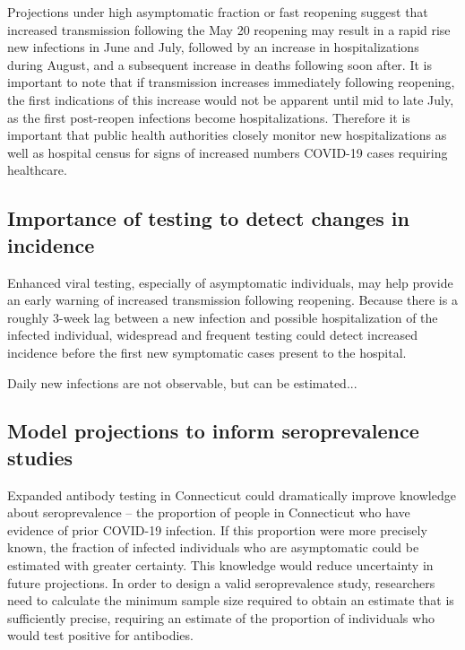 \documentclass[11pt]{article}
\begin{document}
Projections under high asymptomatic fraction or fast reopening suggest that increased transmission following the May 20 reopening may result in a rapid rise new infections in June and July, followed by an increase in hospitalizations during August, and a subsequent increase in deaths following soon after.  It is important to note that if transmission increases immediately following reopening, the first indications of this increase would not be apparent until mid to late July, as the first post-reopen infections become hospitalizations.  Therefore it is important that public health authorities closely monitor new hospitalizations as well as hospital census for signs of increased numbers COVID-19 cases requiring healthcare.   


\subsection*{Importance of testing to detect changes in incidence}

Enhanced viral testing, especially of asymptomatic individuals, may help provide an early warning of increased transmission following reopening.  Because there is a roughly 3-week lag between a new infection and possible hospitalization of the infected individual, widespread and frequent testing could detect increased incidence before the first new symptomatic cases present to the hospital.  

Daily new infections are not observable, but can be estimated...









\subsection*{Model projections to inform seroprevalence studies}

Expanded antibody testing in Connecticut could dramatically improve knowledge about seroprevalence -- the proportion of people in Connecticut who have evidence of prior COVID-19 infection. If this proportion were more precisely known, the fraction of infected individuals who are asymptomatic could be estimated with greater certainty.   This knowledge would reduce uncertainty in future projections.  In order to design a valid seroprevalence study, researchers need to calculate the minimum sample size required to obtain an estimate that is sufficiently precise, requiring an estimate of the proportion of individuals who would test positive for antibodies. 
\end{document}
